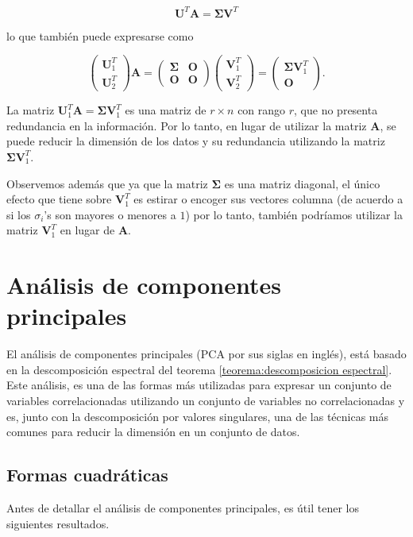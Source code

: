 \documentclass[11pt]{report}
\theoremstyle{break}
\theoremstyle{break}
\newcommand{\matdim}[2]{$#1 \times #2$}
\begin{document}
$$ \bm{U}^{T}\bm{A} = \bm{\Sigma}\bm{V}^{T}$$

lo que también puede expresarse como 

$$
\begin{pmatrix}
\bm{U}_{1}^{T} \\
\bm{U}_{2}^{T}
\end{pmatrix}
\bm{A} =
\begin{pmatrix}
\bm{\Sigma} & \bm{O} \\
\bm{O} & \bm{O}
\end{pmatrix}
\begin{pmatrix}
\bm{V}_{1}^{T} \\
\bm{V}_{2}^{T}
\end{pmatrix}
=
\begin{pmatrix}
\bm{\Sigma} \bm{V}_{1}^{T}\\
\bm{O}
\end{pmatrix}.
$$

La matriz $\bm{U}_{1}^{T} \bm{A} = \bm{\Sigma}\bm{V}_{1}^{T}$ es una matriz de \matdim{r}{n} con rango $r$, que no presenta redundancia en la información. Por lo tanto, en lugar de utilizar la matriz $\bm{A}$, se puede reducir la dimensión de los datos y su redundancia utilizando la matriz $\bm{\Sigma}\bm{V}_{1}^{T}$.

Observemos además que ya que la matriz $\bm{\Sigma}$ es una matriz diagonal, el único efecto que tiene sobre $\bm{V}_{1}^{T}$ es estirar o encoger sus vectores columna (de acuerdo a si los $\sigma_i$'s son mayores o menores a $1$) por lo tanto, también podríamos utilizar la matriz $\bm{V}_{1}^{T}$ en lugar de $\bm{A}$.

\chapter{Análisis de componentes principales}
\label{capitulo:pca}
El análisis de componentes principales (PCA por sus siglas en inglés), está basado en la descomposición espectral del teorema \ref{teorema:descomposicion espectral}. Este análisis, es una de las formas más utilizadas para expresar un conjunto de variables correlacionadas utilizando un conjunto de variables no correlacionadas y es, junto con la descomposición por valores singulares, una de las técnicas más comunes para reducir la dimensión en un conjunto de datos.


\section{Formas cuadráticas}
\label{seccion:formas cuadraticas}
Antes de detallar el análisis de componentes principales, es útil tener los siguientes resultados.
\end{document}
